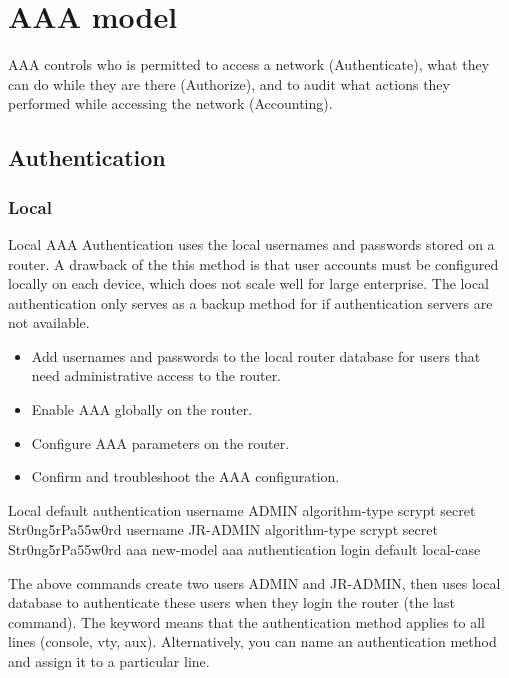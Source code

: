 \chapter{AAA model}

AAA controls who is permitted to access a network (Authenticate), what they can do while they are there (Authorize), and to audit what actions they performed while accessing the network (Accounting).

\section{Authentication}

\subsection{Local}

Local AAA Authentication uses the local usernames and passwords stored on a router. A drawback of the this method is that user accounts must be configured locally on each device, which does not scale well for large enterprise. The local authentication only serves as a backup method for if authentication servers are not available. 

\begin{itemize}
  \item Add usernames and passwords to the local router database for users that need administrative access to the router.
  \item Enable AAA globally on the router.
  \item Configure AAA parameters on the router.
  \item Confirm and troubleshoot the AAA configuration.  
\end{itemize}

\begin{sexylisting}{Local default authentication}
username ADMIN algorithm-type scrypt secret Str0ng5rPa55w0rd
username JR-ADMIN algorithm-type scrypt secret Str0ng5rPa55w0rd
aaa new-model
aaa authentication login default local-case
\end{sexylisting}

The above commands create two users ADMIN and JR-ADMIN, then uses local database to authenticate these users when they login the router (the last command). The  keyword means that the authentication method applies to all lines (console, vty, aux). Alternatively, you can name an authentication method  and assign it to a particular line.\\ 


